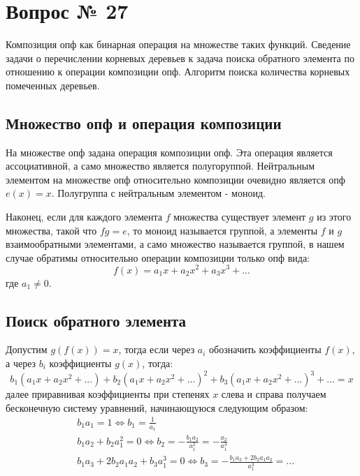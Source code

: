 \chapter{Вопрос № 27}

Композиция опф как бинарная операция на множестве таких функций. Сведение задачи о перечислении корневых деревьев к задача поиска обратного элемента по отношению к операции композиции опф. Алгоритм поиска количества корневых помеченных деревьев.

\section{Множество опф и операция композиции}

На множестве опф задана операция композиции опф. Эта операция является ассоциативной, а само множество является полугоруппой. Нейтральным элементом на множестве опф относительно композиции очевидно является опф $e\left(x\right) = x$. Полугруппа с нейтральным элементом - моноид.

Наконец, если для каждого элемента $f$ множества существует элемент $g$ из этого множества, такой что $fg = e$, то моноид называется группой, а элементы $f$ и $g$ взаимообратными элементами, а само множество называется группой, в нашем случае обратимы относительно операции композиции только опф вида:
\[
	f\left(x\right) = a_1 x + a_2 x^2 + a_3 x^3 + ...
\]
где $a_1 \not= 0$.

\section{Поиск обратного элемента}

Допустим $g\left(f\left(x\right)\right) = x$, тогда если через $a_i$ обозначить коэффициенты $f\left(x\right)$, а через $b_i$ коэффициенты $g\left(x\right)$, тогда:
\[
	b_1\left(a_1x + a_2x^2 + ...\right) + b_2\left(a_1x + a_2x^2 + ... \right)^2 + b_3\left(a_1x+a_2x^2+ ...\right)^3 + ... = x
\]
далее приравнивая коэффициенты при степенях $x$ слева и справа получаем бесконечную систему уравнений, начинающуюся следующим образом:
\[
	\begin{split}
		& b_1a_1 = 1 \Leftrightarrow b_1 = \frac{1}{a_1} \\
		& b_1a_2 + b_2a_1^2 = 0 \Leftrightarrow b_2 = -\frac{b_1a_2}{a_1^2} = -\frac{a_2}{a_1^3} \\
		& b_1a_3 + 2b_2a_1a_2 + b_3a_1^3 = 0 \Leftrightarrow b_3 = -\frac{b_1a_3 + 2b_2a_1a_2}{a_1^3} = ...
	\end{split}
\]

